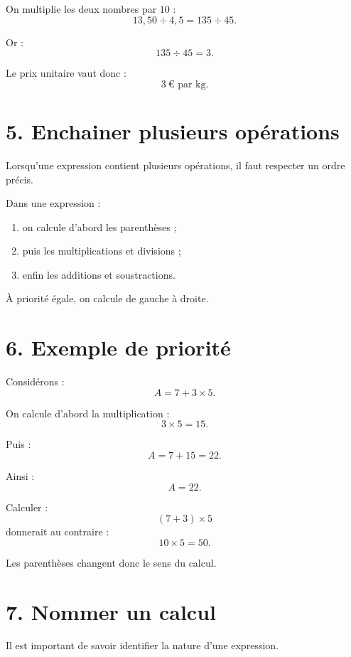 On multiplie les deux nombres par $10$ :
\[
13{,}50\div4{,}5
=
135\div45.
\]

Or :
\[
135\div45=3.
\]

Le prix unitaire vaut donc :
\[
\boxed{3\ \text{€ par kg}}.
\]

\section{5. Enchainer plusieurs opérations}

Lorsqu'une expression contient plusieurs opérations, il faut respecter un ordre précis.


\begin{propriete}
Dans une expression :
\begin{enumerate}
\item on calcule d'abord les parenthèses ;
\item puis les multiplications et divisions ;
\item enfin les additions et soustractions.
\end{enumerate}
À priorité égale, on calcule de gauche à droite.
\end{propriete}

\section{6. Exemple de priorité}

Considérons :
\[
A=7+3\times5.
\]

On calcule d'abord la multiplication :
\[
3\times5=15.
\]

Puis :
\[
A=7+15=22.
\]

Ainsi :
\[
\boxed{A=22}.
\]

Calculer :
\[
(7+3)\times5
\]
donnerait au contraire :
\[
10\times5=50.
\]

Les parenthèses changent donc le sens du calcul.

\section{7. Nommer un calcul}

Il est important de savoir identifier la nature d'une expression.

